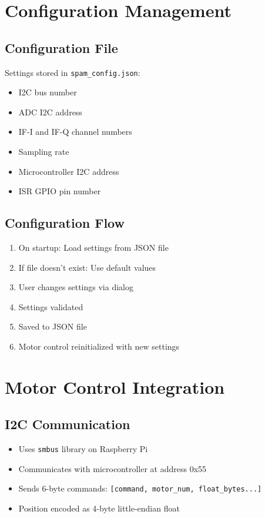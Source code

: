 \documentclass[11pt,a4paper]{article}
\begin{document}
\section{Configuration Management}

\subsection{Configuration File}
Settings stored in \texttt{spam\_config.json}:
\begin{itemize}
    \item I2C bus number
    \item ADC I2C address
    \item IF-I and IF-Q channel numbers
    \item Sampling rate
    \item Microcontroller I2C address
    \item ISR GPIO pin number
\end{itemize}

\subsection{Configuration Flow}
\begin{enumerate}
    \item On startup: Load settings from JSON file
    \item If file doesn't exist: Use default values
    \item User changes settings via dialog
    \item Settings validated
    \item Saved to JSON file
    \item Motor control reinitialized with new settings
\end{enumerate}

\section{Motor Control Integration}

\subsection{I2C Communication}
\begin{itemize}
    \item Uses \texttt{smbus} library on Raspberry Pi
    \item Communicates with microcontroller at address 0x55
    \item Sends 6-byte commands: \texttt{[command, motor\_num, float\_bytes...]}
    \item Position encoded as 4-byte little-endian float
\end{itemize}
\end{document}
